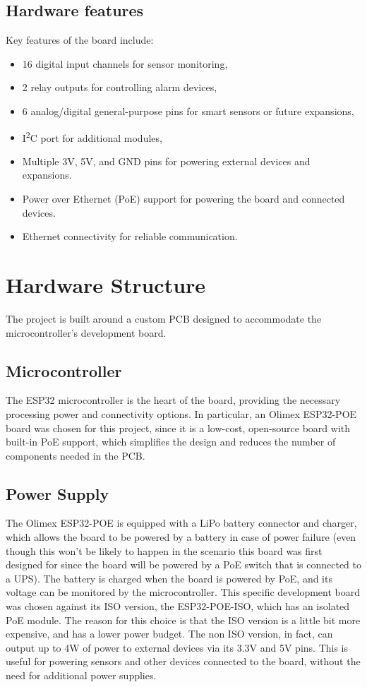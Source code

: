 \documentclass[a4paper,12pt]{article}
\begin{document}
\subsection{Hardware features}
Key features of the board include:
\begin{itemize}
    \item 16 digital input channels for sensor monitoring,
    \item 2 relay outputs for controlling alarm devices,
    \item 6 analog/digital general-purpose pins for smart sensors or future expansions,
    \item I\textsuperscript{2}C port for additional modules,
    \item Multiple 3V, 5V, and GND pins for powering external devices and expansions.
    \item Power over Ethernet (PoE) support for powering the board and connected devices.
    \item Ethernet connectivity for reliable communication.
\end{itemize}

\newpage
\section{Hardware Structure}
The project is built around a custom PCB designed to accommodate the microcontroller's development board. 

\subsection{Microcontroller}
The ESP32 microcontroller is the heart of the board, providing the necessary processing power and connectivity options. In particular, an Olimex ESP32-POE board \cite{olimexESP32POEOpenSource} was chosen for this project, since it is a low-cost, open-source board with built-in PoE support, which simplifies the design and reduces the number of components needed in the PCB. 

\subsection{Power Supply}
The Olimex ESP32-POE is equipped with a LiPo battery connector and charger, which allows the board to be powered by a battery in case of power failure (even though this won't be likely to happen in the scenario this board was first designed for since the board will be powered by a PoE switch that is connected to a UPS). The battery is charged when the board is powered by PoE, and its voltage can be monitored by the microcontroller. 
This specific development board was chosen against its ISO version, the ESP32-POE-ISO, which has an isolated PoE module. The reason for this choice is that the ISO version is a little bit more expensive, and has a lower power budget. The non ISO version, in fact, can output up to 4W of power to external devices via its 3.3V and 5V pins. This is useful for powering sensors and other devices connected to the board, without the need for additional power supplies. 
\end{document}

